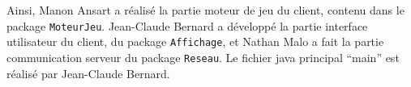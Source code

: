 	Ainsi, Manon Ansart a réalisé la partie moteur de jeu du client, contenu dans le package \texttt{MoteurJeu}. Jean-Claude Bernard a développé la partie interface utilisateur du client, du package \texttt{Affichage}, et Nathan Malo a fait la partie communication serveur du package \texttt{Reseau}. Le fichier java principal \enquote{main} est réalisé par Jean-Claude Bernard.
